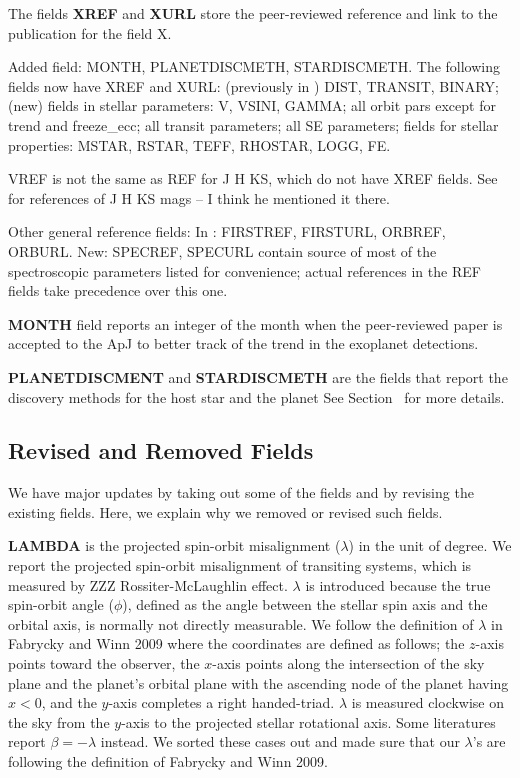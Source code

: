 \documentclass[11pt,preprint]{aastex}
\begin{document}
\begin{CJK*}{UTF8}{gbsn}
The fields {\bf XREF} and {\bf XURL} store the peer-reviewed reference and link to
the publication for the field X. 

Added field: MONTH, PLANETDISCMETH, STARDISCMETH.
The following fields now have XREF and XURL: (previously in \cite{Wright2011}) DIST, TRANSIT, BINARY; (new) fields in stellar parameters: V, VSINI, GAMMA; all orbit pars except for trend and freeze\_ecc; all transit parameters; all SE parameters; fields for stellar properties: MSTAR, RSTAR, TEFF, RHOSTAR, LOGG, FE.

VREF is not the same as REF for J H KS, which do not have XREF
fields. See \cite{Wright2011} for references of J H KS mags -- I think
he mentioned it there.

Other general reference fields: In \cite{Wright2011}: FIRSTREF,
FIRSTURL, ORBREF, ORBURL. New: SPECREF, SPECURL contain source of most
of the spectroscopic parameters listed for convenience; actual
references in the REF fields take precedence over this one.

{\bf MONTH} field reports an integer of the month when the peer-reviewed paper is accepted to the
ApJ to better track of the trend in the exoplanet detections. 

{\bf PLANETDISCMENT} and {\bf STARDISCMETH} are the fields that report the discovery methods for the host star and the planet See Section~ for more details.  


\subsection{Revised and Removed Fields}
We have major updates by taking out some of the fields and by revising the existing fields. Here, we explain why we removed or revised such fields. 

{\bf LAMBDA} is the projected spin-orbit misalignment ($\lambda$) in the unit of degree. We report the projected spin-orbit misalignment of transiting systems, which is measured by ZZZ Rossiter-McLaughlin effect. $\lambda$ is introduced because the true spin-orbit angle ($\phi$), defined as the angle between the stellar spin axis and the orbital axis, is normally not directly measurable. We follow the definition of $\lambda$ in Fabrycky and Winn 2009 where the coordinates are defined as follows; the $z$-axis points toward the observer, the $x$-axis points along the intersection of the sky plane and the planet's orbital plane with the ascending node of the planet having $x<0$, and the $y$-axis completes a right handed-triad. $\lambda$ is measured clockwise on the sky from the $y$-axis to the projected stellar rotational axis. Some literatures report $\beta = -\lambda$ instead. We sorted these cases out and made sure that our $\lambda$'s are following the definition of Fabrycky and Winn 2009. 


\end{CJK*}
\end{document}
